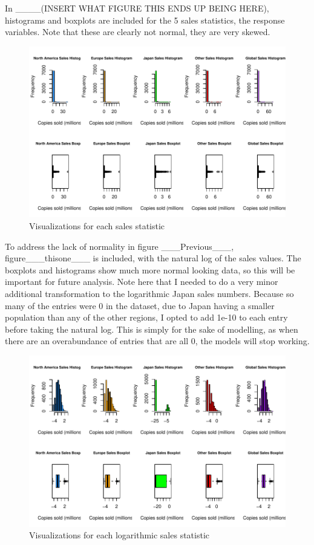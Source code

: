 \documentclass[12pt]{article}
\begin{document}
In ____(INSERT WHAT FIGURE THIS ENDS UP BEING HERE), histograms and boxplots are included for the 5 sales statistics, the response variables.
Note that these are clearly not normal, they are very skewed. 

\begin{figure}[tbp]
  \centering
  \includegraphics[width=\textwidth]{histandboxsales.pdf}
  \caption{Visualizations for each sales statistic}
  \label{fig:histandboxsales}
\end{figure}

To address the lack of normality in figure ___Previous___, figure___thisone___ is included, with the natural log of the sales values.
The boxplots and histograms show much more normal looking data, so this will be important for future analysis. 
Note here that I needed to do a very minor additional transformation to the logarithmic Japan sales numbers. Because so many of the entries
were 0 in the dataset, due to Japan having a smaller population than any of the other regions, I opted to add 1e-10 to each entry before taking
the natural log. This is simply for the sake of modelling, as when there are an overabundance of entries that are all 0, the models will stop working.

\begin{figure}[tbp]
  \centering
  \includegraphics[width=\textwidth]{histandboxlogs.pdf}
  \caption{Visualizations for each logarithmic sales statistic}
  \label{fig:histandboxlogs}
\end{figure}
\end{document}
